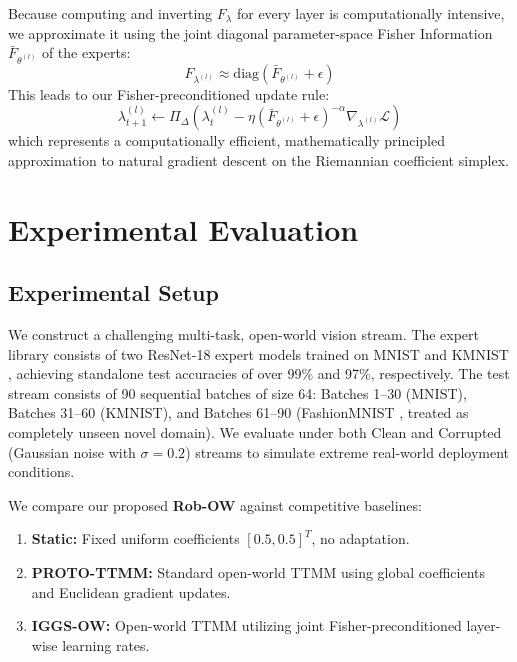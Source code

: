 \documentclass{article}
\begin{document}
Because computing and inverting $F_{\lambda}$ for every layer is computationally intensive, we approximate it using the joint diagonal parameter-space Fisher Information $\bar{F}_{\theta^{(l)}}$ of the experts:
\begin{equation}
F_{\lambda^{(l)}} \approx \text{diag}(\bar{F}_{\theta^{(l)}} + \epsilon)
\end{equation}
This leads to our Fisher-preconditioned update rule:
\begin{equation}
\lambda^{(l)}_{t+1} \leftarrow \Pi_\Delta \left( \lambda^{(l)}_t - \eta (\bar{F}_{\theta^{(l)}} + \epsilon)^{-\alpha} \nabla_{\lambda^{(l)}} \mathcal{L} \right)
\end{equation}
which represents a computationally efficient, mathematically principled approximation to natural gradient descent on the Riemannian coefficient simplex.

\section{Experimental Evaluation}
\label{sec:experiments}

\subsection{Experimental Setup}
We construct a challenging multi-task, open-world vision stream. The expert library consists of two ResNet-18 expert models \cite{he2016deep} trained on MNIST \cite{lecun1998gradient} and KMNIST \cite{clanuwat2018deep}, achieving standalone test accuracies of over 99\% and 97\%, respectively. The test stream consists of 90 sequential batches of size 64: Batches 1--30 (MNIST), Batches 31--60 (KMNIST), and Batches 61--90 (FashionMNIST \cite{xiao2017fashion}, treated as completely unseen novel domain). We evaluate under both Clean and Corrupted (Gaussian noise with $\sigma=0.2$) streams to simulate extreme real-world deployment conditions.

We compare our proposed \textbf{Rob-OW} against competitive baselines:
\begin{enumerate}
    \item \textbf{Static:} Fixed uniform coefficients $[0.5, 0.5]^T$, no adaptation.
    \item \textbf{PROTO-TTMM:} Standard open-world TTMM using global coefficients and Euclidean gradient updates.
    \item \textbf{IGGS-OW:} Open-world TTMM utilizing joint Fisher-preconditioned layer-wise learning rates.
\end{enumerate}
\end{document}
